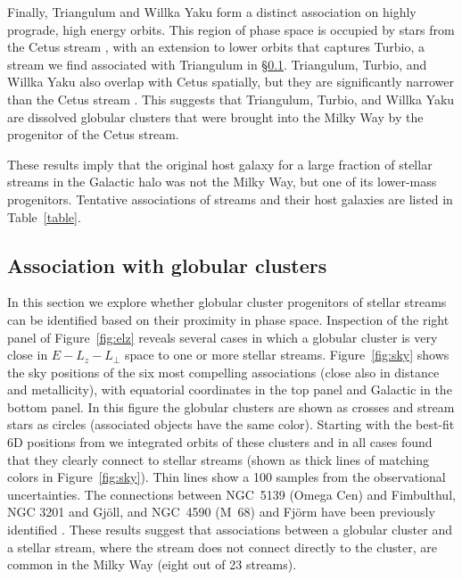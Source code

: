 \documentclass[twocolumn]{aastex63}
\begin{document}
Finally, Triangulum and Willka Yaku form a distinct association on highly prograde, high energy orbits.
This region of phase space is occupied by stars from the Cetus stream \citep{yuan2019}, with an extension to lower orbits that captures Turbio, a stream we find associated with Triangulum in \S\ref{sec:progenitors}.
Triangulum, Turbio, and Willka Yaku also overlap with Cetus spatially, but they are significantly narrower than the Cetus stream \citep[$0.25\,\deg$ vs. $\approx2\,\deg$,][]{bonaca2012, shipp2018, newberg2009}.
This suggests that Triangulum, Turbio, and Willka Yaku are dissolved globular clusters that were brought into the Milky Way by the progenitor of the Cetus stream.

These results imply that the original host galaxy for a large fraction of stellar streams in the Galactic halo was not the Milky Way, but one of its lower-mass progenitors.
Tentative associations of streams and their host galaxies are listed in Table~\ref{table}.


\subsection{Association with globular clusters}
\label{sec:progenitors}
In this section we explore whether globular cluster progenitors of stellar streams can be identified based on their proximity in phase space.
Inspection of the right panel of Figure~\ref{fig:elz} reveals several cases in which a globular cluster is very close in $E-L_z-L_\perp$ space to one or more stellar streams.
Figure~\ref{fig:sky} shows the sky positions of the six most compelling associations (close also in distance and metallicity), with equatorial coordinates in the top panel and Galactic in the bottom panel.
In this figure the globular clusters are shown as crosses and stream stars as circles (associated objects have the same color).
Starting with the best-fit 6D positions from \citet{baumgardt2019} we integrated orbits of these clusters and in all cases found that they clearly connect to stellar streams (shown as thick lines of matching colors in Figure~\ref{fig:sky}).
Thin lines show a 100 samples from the observational uncertainties.
The connections between NGC~5139 (Omega Cen) and Fimbulthul, NGC 3201 and Gj\" oll, and NGC~4590 (M~68) and Fj\" orm have been previously identified \citep[and references therein]{ibata2021}.
These results suggest that associations between a globular cluster and a stellar stream, where the stream does not connect directly to the cluster, are common in the Milky Way (eight out of 23 streams).
\end{document}
